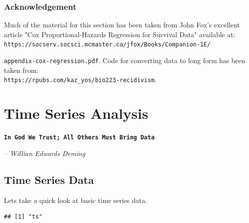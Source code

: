 \documentclass[11pt, letterpaper, twoside]{memoir}\usepackage{knitr}
\newcommand{\chapterendsymbol}{
    \vspace{24pt}
    \Huge
    \hrulefill \hspace{0.1in} \floweroneleft\floweroneright \hspace{0.1in} \hrulefill
    \normalsize
    }
\begin{document}
\subsection{Acknowledgement}

Much of the material for this section has been taken from John Fox's excellent article "Cox Proportional-Hazards Regression for Survival Data" available at:\\ 
\small
\verb|https://socserv.socsci.mcmaster.ca/jfox/Books/Companion-1E/| 

\verb|appendix-cox-regression.pdf|. 
\normalsize
Code for converting data to long form has been taken from: \\ \verb|https://rpubs.com/kaz_yos/bio223-recidivism|. 

\chapterendsymbol




\chapter{Time Series Analysis}

\begin{flushright}

\textbf{\texttt{In God We Trust; All Others Must Bring Data}}

\emph{-- Willian Edwards Deming}

\end{flushright}

\vspace{12pt}

\section{Time Series Data}

Lets take a quick look at basic time series data.
\begin{knitrout}
\color{fgcolor}\begin{kframe}
\begin{alltt}
\hlstd{(}\hlstd{)}
\end{alltt}
\begin{verbatim}
## [1] "ts"
\end{verbatim}
\end{kframe}
\end{knitrout}
\end{document}
